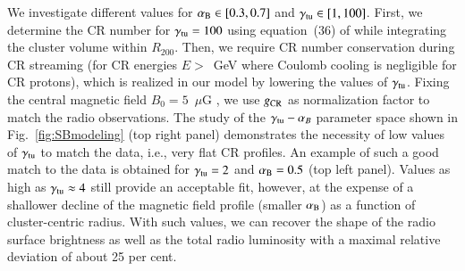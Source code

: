 \documentclass[useAMS,usenatbib]{mn2e}
\begin{document}
We investigate different values for $\alpha_{{\mathrm{B}}}\in [0.3,0.7]$ and
$\gamma_{{\mathrm{tu}}}\in [1,100]$. First, we determine the CR number for
$\gamma_{{\mathrm{tu}}}=100$ using equation~(36) of \cite{2011A&A...527A..99E} while
integrating the cluster volume within $R_{200}$. Then, we require CR number
conservation during CR streaming (for CR energies $E>$~GeV where Coulomb cooling
is negligible for CR protons), which is realized in our model by lowering the
values of $\gamma_{{\mathrm{tu}}}$. Fixing the central magnetic field
$B_{0}=5$~$\mu$G \citep{2010A&A...513A..30B}, we use $g_{{\mathrm{CR}}}$ as
normalization factor to match the radio observations.  The study of the
$\gamma_{{\mathrm{tu}}}-\alpha_{B}$ parameter space shown in
Fig.~\ref{fig:SBmodeling} (top right panel) demonstrates the necessity of low
values of $\gamma_{{\mathrm{tu}}}$ to match the data, i.e., very flat CR profiles. An
example of such a good match to the data is obtained for $\gamma_{{\mathrm{tu}}}=2$
and $\alpha_{{\mathrm{B}}}=0.5$ (top left panel). Values as high as
$\gamma_{{\mathrm{tu}}} \approx 4$ still provide an acceptable fit, however, at the expense
of a shallower decline of the magnetic field profile (smaller $ \alpha_{{\mathrm{B}}}$) as a
function of cluster-centric radius. With such values, we can recover the shape
of the radio surface brightness as well as the total radio luminosity with a
maximal relative deviation of about 25 per cent.
\end{document}
